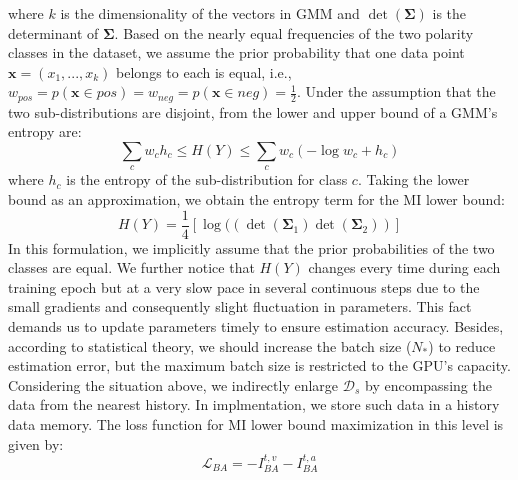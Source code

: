 \documentclass[11pt]{article}
\begin{document}
where $k$ is the dimensionality of the vectors in GMM and $\det(\bm{\Sigma})$ is the determinant of $\bm{\Sigma}$.
Based on the nearly equal frequencies of the two polarity classes in the dataset, we assume the prior probability that one data point $\bm{x}=(x_1,...,x_k)$ belongs to each is equal, i.e., $w_{pos}=p(\bm{x}\in pos)=w_{neg}=p(\bm{x}\in neg)=\frac{1}{2}$. 
Under the assumption that the two sub-distributions are disjoint, from \citet{huber2008entropy} the lower and upper bound of a GMM's entropy are:
\begin{equation}
    \sum_c w_ch_c \leq H(Y) \leq \sum_c w_c(-\log w_c +h_c)
\end{equation}
where $h_c$ is the entropy of the sub-distribution for class $c$.
Taking the lower bound as an approximation, we obtain the entropy term for the MI lower bound:
\begin{equation} \label{entropy estimation}
    H(Y) = \frac{1}{4}\left[\log((\det(\bm{\Sigma}_1)\det(\bm{\Sigma}_2))\right]
\end{equation}
In this formulation, we implicitly assume that the prior probabilities of the two classes are equal. 
We further notice that $H(Y)$ changes every time during each training epoch but at a very slow pace in several continuous steps due to the small gradients and consequently slight fluctuation in parameters.
This fact demands us to update parameters timely to ensure estimation accuracy.
Besides, according to statistical theory, we should increase the batch size ($N_*$) to reduce estimation error, but the maximum batch size is restricted to the GPU's capacity.
Considering the situation above, we indirectly enlarge $\mathcal{D}_s$ by encompassing the data from the nearest history.
In implmentation, we store such data in a history data memory.
The loss function for MI lower bound maximization in this level is given by:
\begin{equation} \label{BA Loss}
    \mathcal{L}_{BA} = -I_{BA}^{t,v} - I_{BA}^{t,a}
\end{equation} \label{LBA}
\label{MI1}        
\end{document}
